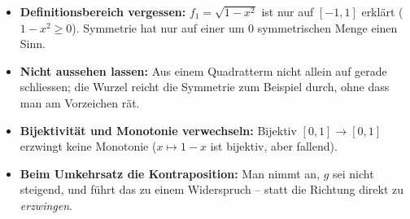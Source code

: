 \begin{achtung}
\begin{itemize}
  \item \textbf{Definitionsbereich vergessen:} $f_1=\sqrt{1-x^2}$ ist nur
        auf $[-1,1]$ erklärt ($1-x^2\ge 0$). Symmetrie hat nur auf einer um
        $0$ symmetrischen Menge einen Sinn.
  \item \textbf{Nicht aussehen lassen:} Aus einem Quadratterm nicht allein
        auf gerade schliessen; die Wurzel reicht die Symmetrie zum Beispiel
        durch, ohne dass man am Vorzeichen rät.
  \item \textbf{Bijektivität und Monotonie verwechseln:} Bijektiv
        $[0,1]\to[0,1]$ erzwingt keine Monotonie ($x\mapsto 1-x$ ist
        bijektiv, aber fallend).
  \item \textbf{Beim Umkehrsatz die Kontraposition:} Man nimmt an, $g$ sei
        nicht steigend, und führt das zu einem Widerspruch -- statt die
        Richtung direkt zu \emph{erzwingen}.
\end{itemize}
\end{achtung}
